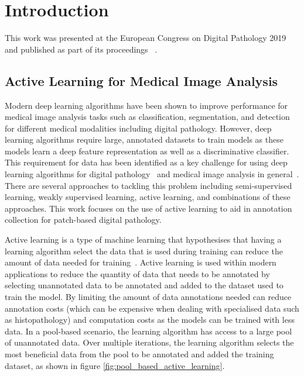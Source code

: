 \section{Introduction}
\label{sec:active_introduction}
This work was presented at the European Congress on Digital Pathology 2019 and published as part of its proceedings ~\citep{carse2019active}.

\subsection{Active Learning for Medical Image Analysis}
\label{subsec:active_for_medical_image_analysis}
Modern deep learning algorithms have been shown to improve performance for medical image analysis tasks such as classification, segmentation, and detection for different medical modalities including digital pathology. However, deep learning algorithms require large, annotated datasets to train models as these models learn a deep feature representation as well as a discriminative classifier. This requirement for data has been identified as a key challenge for using deep learning algorithms for digital pathology~\citep{tizhoosh2018artificial} and medical image analysis in general~\citep{litjens2017survey}. There are several approaches to tackling this problem including semi-supervised learning, weakly supervised learning, active learning, and combinations of these approaches. This work focuses on the use of active learning to aid in annotation collection for patch-based digital pathology.

Active learning is a type of machine learning that hypothesises that having a learning algorithm select the data that is used during training can reduce the amount of data needed for training~\citep{settles2012active}. Active learning is used within modern applications to reduce the quantity of data that needs to be annotated by selecting unannotated data to be annotated and added to the dataset used to train the model. By limiting the amount of data annotations needed can reduce annotation costs (which can be expensive when dealing with specialised data such as histopathology) and computation costs as the models can be trained with less data. In a pool-based scenario, the learning algorithm has access to a large pool of unannotated data. Over multiple iterations, the learning algorithm selects the most beneficial data from the pool to be annotated and added the training dataset, as shown in figure \ref{fig:pool_based_active_learning}.

